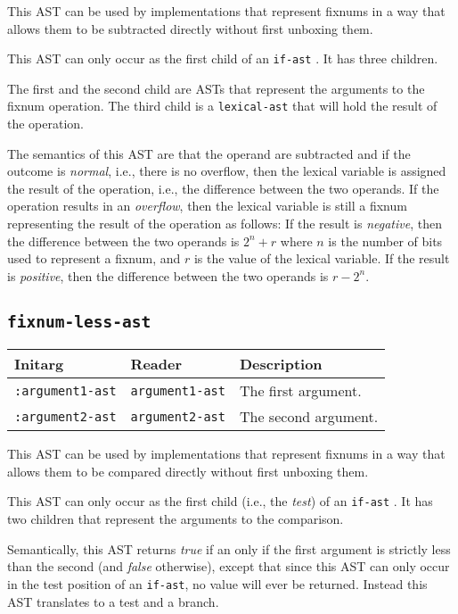 This AST can be used by implementations that represent fixnums in a
way that allows them to be subtracted directly without first unboxing
them.

This AST can only occur as the first child of an \texttt{if-ast}
.  It has three children.

The first and the second child are ASTs that represent the arguments
to the fixnum operation.  The third child is a
\texttt{lexical-ast} that will hold the result of the operation.

The semantics of this AST are that the operand are subtracted and if
the outcome is \emph{normal}, i.e., there is no overflow, then the
lexical variable is assigned the result of the operation, i.e., the
difference between the two operands.  If the operation results in an
\emph{overflow}, then the lexical variable is still a fixnum
representing the result of the operation as follows: If the result is
\emph{negative}, then the difference between the two operands is $2^n
+ r$ where $n$ is the number of bits used to represent a fixnum, and
$r$ is the value of the lexical variable.  If the result is
\emph{positive}, then the difference between the two operands is $r -
2^n$.

\subsection{\texttt{fixnum-less-ast}}
\label{fixnum-less-ast}

\begin{tabular}{|l|l|l|}
\hline
Initarg & Reader & Description\\
\hline\hline
\texttt{:argument1-ast} & \texttt{argument1-ast} & The first argument.\\
\hline
\texttt{:argument2-ast} & \texttt{argument2-ast} & The second argument.\\
\hline
\end{tabular}

This AST can be used by implementations that represent fixnums in a
way that allows them to be compared directly without first unboxing
them.

This AST can only occur as the first child (i.e., the \emph{test}) of
an \texttt{if-ast} .  It has two children that
represent the arguments to the comparison.  

Semantically, this AST returns \emph{true} if an only if the first
argument is strictly less than the second (and \emph{false}
otherwise), except that since this AST can only occur in the test
position of an \texttt{if-ast}, no value will ever be returned.
Instead this AST translates to a test and a branch. 

